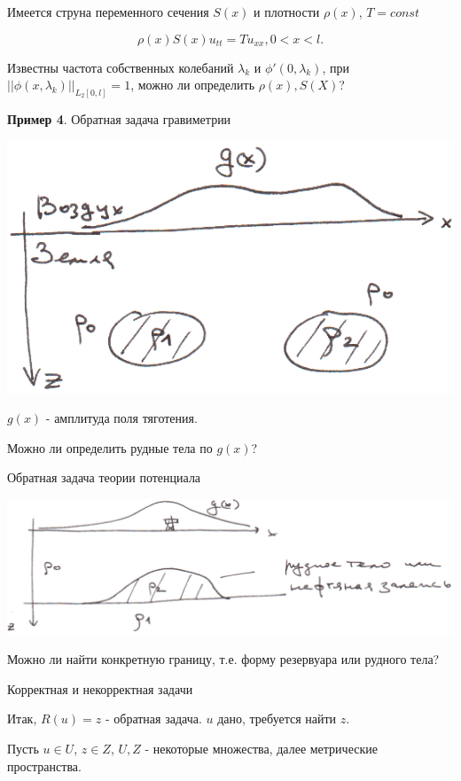 \documentclass{article}
\begin{document}
Имеется струна переменного сечения $S(x)$ и плотности $\rho(x)$, $T = const$

$$ \rho(x) S(x) u_{tt} = T u_{xx}, 0 < x < l. $$

Известны частота собственных колебаний ${\lambda_k}$ и ${\phi'(0,\lambda_k)}$, при $|| \phi(x,\lambda_k)||_{L_2[0,l]}=1$, можно ли определить $\rho(x), S(X)$?

\bigskip

\textbf{Пример 4}. Обратная задача гравиметрии

\includegraphics[scale=0.6]{example4_1.png}

$g(x)$ - амплитуда поля тяготения. 

Можно ли определить рудные тела по $g(x)$?

\smallskip
Обратная задача теории потенциала

\includegraphics[scale=0.6]{example4_2.png}

Можно ли найти конкретную границу, т.е. форму резервуара или рудного тела?


\bigskip


\centerline{\large Корректная и некорректная задачи}


Итак, $R(u) = z$ - обратная задача. $u$ дано, требуется найти $z$.

Пусть $u \in U$, $z \in Z$, $U,Z$ - некоторые множества, далее метрические пространства.
\end{document}
